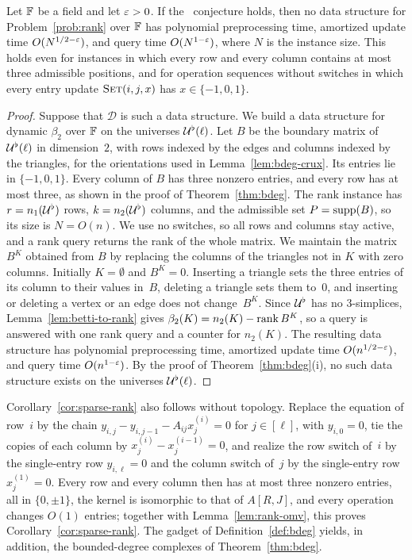 \begin{corollary}\label{cor:sparse-rank}
Let $\mathbb{F}$ be a field and let $\varepsilon>0$.
If the \OMv\ conjecture holds, then no data structure for Problem~\ref{prob:rank} over $\mathbb{F}$ has polynomial preprocessing time, amortized update time $O(N^{1/2-\varepsilon})$, and query time $O(N^{1-\varepsilon})$, where $N$ is the instance size.
This holds even for instances in which every row and every column contains at most three admissible positions, and for operation sequences without switches in which every entry update $\textsc{Set}(i,j,x)$ has $x\in\{-1,0,1\}$.
\end{corollary}

\begin{proof}
Suppose that $\mathcal{D}$ is such a data structure.
We build a data structure for dynamic $\beta_2$ over $\mathbb{F}$ on the universes $\mathcal{U}^{\flat}(\ell)$.
Let $B$ be the boundary matrix of $\mathcal{U}^{\flat}(\ell)$ in dimension~$2$, with rows indexed by the edges and columns indexed by the triangles, for the orientations used in Lemma~\ref{lem:bdeg-crux}.
Its entries lie in $\{-1,0,1\}$.
Every column of $B$ has three nonzero entries, and every row has at most three, as shown in the proof of Theorem~\ref{thm:bdeg}.
The rank instance has $r=n_1(\mathcal{U}^{\flat})$ rows, $k=n_2(\mathcal{U}^{\flat})$ columns, and the admissible set $P=\operatorname{supp}(B)$, so its size is $N=O(n)$.
We use no switches, so all rows and columns stay active, and a rank query returns the rank of the whole matrix.
We maintain the matrix $B^K$ obtained from $B$ by replacing the columns of the triangles not in $K$ with zero columns.
Initially $K=\emptyset$ and $B^K=0$.
Inserting a triangle sets the three entries of its column to their values in~$B$, deleting a triangle sets them to~$0$, and inserting or deleting a vertex or an edge does not change~$B^K$.
Since $\mathcal{U}^{\flat}$ has no $3$-simplices, Lemma~\ref{lem:betti-to-rank} gives $\beta_2(K)=n_2(K)-\operatorname{rank} B^K$, so a query is answered with one rank query and a counter for $n_2(K)$.
The resulting data structure has polynomial preprocessing time, amortized update time $O(n^{1/2-\varepsilon})$, and query time $O(n^{1-\varepsilon})$.
By the proof of Theorem~\ref{thm:bdeg}(i), no such data structure exists on the universes $\mathcal{U}^{\flat}(\ell)$.
\end{proof}

Corollary~\ref{cor:sparse-rank} also follows without topology.
Replace the equation of row~$i$ by the chain $y_{i,j}-y_{i,j-1}-A_{ij}x^{(i)}_j=0$ for $j\in[\ell]$, with $y_{i,0}=0$, tie the copies of each column by $x^{(i)}_j-x^{(i-1)}_j=0$, and realize the row switch of~$i$ by the single-entry row $y_{i,\ell}=0$ and the column switch of~$j$ by the single-entry row $x^{(1)}_j=0$.
Every row and every column then has at most three nonzero entries, all in $\{0,\pm1\}$, the kernel is isomorphic to that of $A[R,J]$, and every operation changes $O(1)$ entries; together with Lemma~\ref{lem:rank-omv}, this proves Corollary~\ref{cor:sparse-rank}.
The gadget of Definition~\ref{def:bdeg} yields, in addition, the bounded-degree complexes of Theorem~\ref{thm:bdeg}.

